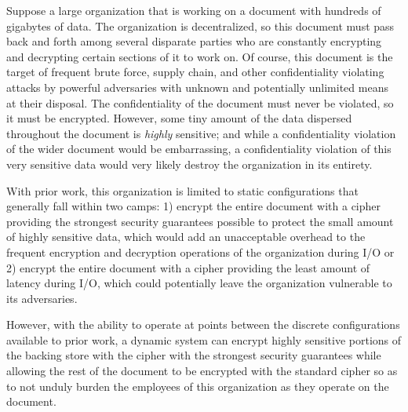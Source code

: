 Suppose a large organization that is working on a document with hundreds of
gigabytes of data. The organization is decentralized, so this document must pass
back and forth among several disparate parties who are constantly encrypting and
decrypting certain sections of it to work on. Of course, this document is the
target of frequent brute force, supply chain, and other confidentiality
violating attacks by powerful adversaries with unknown and potentially unlimited
means at their disposal. The confidentiality of the document must never be
violated, so it must be encrypted. However, some tiny amount of the data
dispersed throughout the document is \emph{highly} sensitive; and while a
confidentiality violation of the wider document would be embarrassing, a
confidentiality violation of this very sensitive data would very likely destroy
the organization in its entirety.

With prior work, this organization is limited to static configurations that
generally fall within two camps: 1) encrypt the entire document with a cipher
providing the strongest security guarantees possible to protect the small amount
of highly sensitive data, which would add an unacceptable overhead to the
frequent encryption and decryption operations of the organization during I/O or
2) encrypt the entire document with a cipher providing the least amount of
latency during I/O, which could potentially leave the organization vulnerable to
its adversaries.

However, with the ability to operate at points between the discrete
configurations available to prior work, a dynamic system can encrypt highly
sensitive portions of the backing store with the cipher with the strongest
security guarantees while allowing the rest of the document to be encrypted with
the standard cipher so as to not unduly burden the employees of this
organization as they operate on the document.
